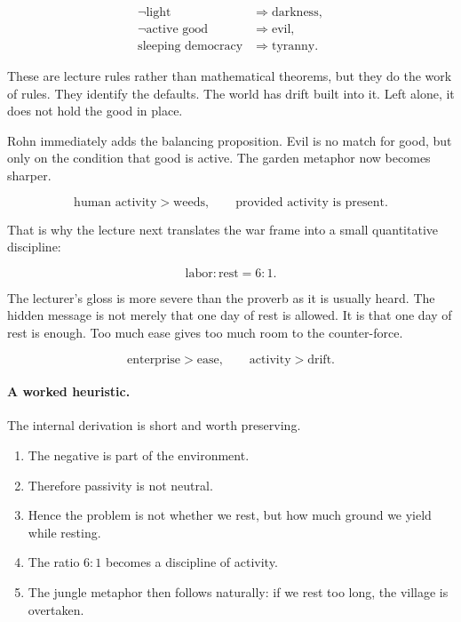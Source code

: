 \begin{align}
\neg \text{light} &\Rightarrow \text{darkness},\\
\neg \text{active good} &\Rightarrow \text{evil},\\
\text{sleeping democracy} &\Rightarrow \text{tyranny}.
\end{align}

These are lecture rules rather than mathematical theorems, but they do the work of rules. They identify the defaults. The world has drift built into it. Left alone, it does not hold the good in place.

Rohn immediately adds the balancing proposition. Evil is no match for good, but only on the condition that good is active. The garden metaphor now becomes sharper.

\begin{equation}
\text{human activity} > \text{weeds}, \qquad \text{provided activity is present}.
\end{equation}

That is why the lecture next translates the war frame into a small quantitative discipline:

\begin{equation}
\text{labor}:\text{rest} = 6:1.
\end{equation}

The lecturer's gloss is more severe than the proverb as it is usually heard. The hidden message is not merely that one day of rest is allowed. It is that one day of rest is enough. Too much ease gives too much room to the counter-force.

\begin{equation}
\text{enterprise} > \text{ease}, \qquad \text{activity} > \text{drift}.
\end{equation}

\paragraph{A worked heuristic.}
The internal derivation is short and worth preserving.
\begin{enumerate}
\item The negative is part of the environment.
\item Therefore passivity is not neutral.
\item Hence the problem is not whether we rest, but how much ground we yield while resting.
\item The ratio \(6:1\) becomes a discipline of activity.
\item The jungle metaphor then follows naturally: if we rest too long, the village is overtaken.
\end{enumerate}

